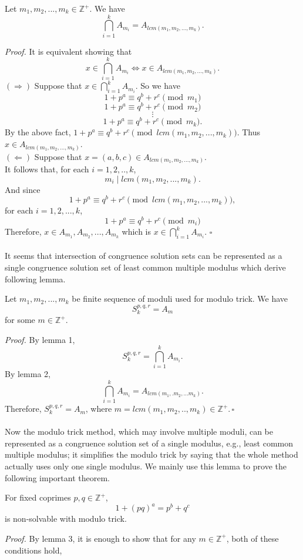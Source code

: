 \documentclass[12pt]{article}
\begin{document}
\begin{lemma} Let $m_1,m_2,...,m_k \in \mathbb{Z}^+$. We have
\[\bigcap_{i=1}^kA_{m_i} = A_{lcm(m_1,m_2,...,m_k)}.\]
\end{lemma} 
\noindent
\textit{Proof.} It is equivalent showing that \[x\in \bigcap_{i=1}^kA_{m_i} \iff x\in A_{lcm(m_1,m_2,...,m_k)}.\]
$(\Rightarrow)$ Suppose that $x \in \bigcap_{i=1}^k A_{m_i}$. So we have
\[1+p^a \equiv q^b+r^c \pmod {m_1}\]
\[1+p^a \equiv q^b+r^c \pmod {m_2}\]
\[\vdots\]
\[1+p^a \equiv q^b+r^c \pmod {m_k}.\]
By the above fact, $1+p^a \equiv q^b+r^c \pmod {lcm(m_1,m_2,...,m_k)}$. Thus $x \in A_{lcm(m_1,m_2,...,m_k)}$.\\
$(\Leftarrow)$ Suppose that $x= (a,b,c) \in A_{lcm(m_1,m_2,...,m_k)}$. \\
It follows that, for each $i=1,2,..,k$,
\[m_i \; | \; lcm(m_1,m_2,...,m_k).\]
And since
\[1+p^a \equiv q^b +r^c \pmod {lcm(m_1,m_2,...,m_k)},\]
for each $i=1,2,...,k$, 
\[1+p^a \equiv q^b + r^c \pmod {m_i}\]
Therefore, $x\in A_{m_1},A_{m_2},...,A_{m_k} $ which is $x \in \bigcap_{i=1}^kA_{m_i}$. $\square$ \\\\
It seems that intersection of congruence solution sets can be represented as a single congruence solution set of least common multiple modulus which derive following lemma.
\begin{lemma} Let $m_1,m_2,...,m_k$ be finite sequence of moduli used for modulo trick. We have
\[S^{p,q,r}_k = A_m \]
for some $m \in \mathbb{Z}^{+}$.
\end{lemma}
\noindent
\textit{Proof.} By lemma 1, 
\[S^{p,q,r}_k = \bigcap_{i=1}^k A_{m_i}.\]
By lemma 2, \[\bigcap_{i=1}^k A_{m_i} = A_{lcm(m_1,.m_2,...m_k)} . \]
Therefore, $S^{p,q,r}_k = A_m$, where $m=lcm(m_1,m_2,..,m_k)  \in \mathbb{Z}^{+}.\,\square$\\\\
\hspace*{0.5cm} Now the modulo trick method, which may involve multiple moduli, can be represented as a congruence solution set of a single modulus, e.g., least common multiple modulus; it simplifies the modulo trick by saying that the whole method actually uses only one single modulus. We mainly use this lemma to prove the following important theorem.
\begin{theorem} For fixed coprimes $p,q\in\mathbb{Z}^+$,
    \[1+(pq)^a = p^b +q^c\]
is non-solvable with modulo trick.
\end{theorem}
\noindent
\textit{Proof.} By lemma 3, it is enough to show that for any $m\in \mathbb{Z}^{+}$, both of these conditions hold,
\end{document}

